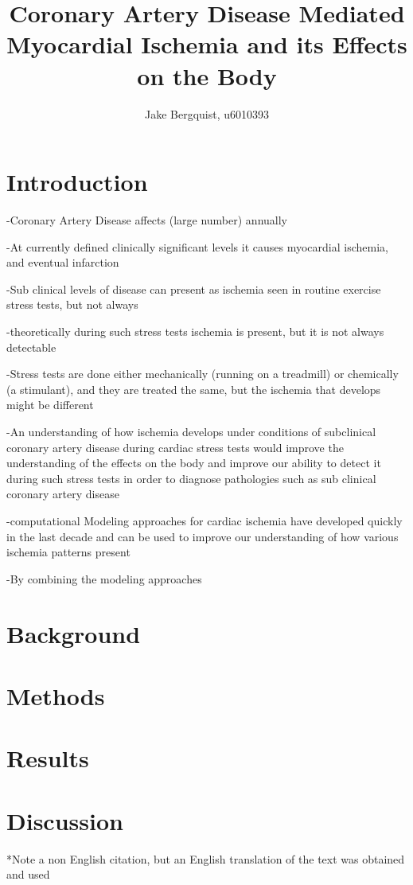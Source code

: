 \documentclass[12pt]{article}
\begin{document}
\title{Coronary Artery Disease Mediated Myocardial Ischemia and its Effects on the Body }
\author{Jake Bergquist, u6010393}
\maketitle

\section{Introduction}

-Coronary Artery Disease affects (large number) annually

-At currently defined clinically significant levels it causes myocardial ischemia, and eventual infarction

-Sub clinical levels of disease can present as ischemia seen in routine exercise stress tests, but not always

-theoretically during such stress tests ischemia is present, but it is not always detectable

-Stress tests are done either mechanically (running on a treadmill) or chemically (a stimulant), and they are treated the same, but the ischemia that develops might be different

-An understanding of how ischemia develops under conditions of subclinical coronary artery disease during cardiac stress tests would improve the understanding of the effects on the body and improve our ability to detect it during such stress tests in order to diagnose pathologies such as sub clinical coronary artery disease

-computational Modeling approaches for cardiac ischemia have developed quickly in the last decade and can be used to improve our understanding of how various ischemia patterns present

-By combining the modeling approaches 

\section{Background}

\section{Methods}

\section{Results}

\section{Discussion}




*Note a non English citation, but an English translation of the text was obtained and used
\end{document}
